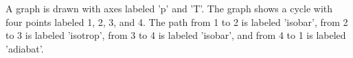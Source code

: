 A graph is drawn with axes labeled 'p' and 'T'. The graph shows a cycle with four points labeled 1, 2, 3, and 4. The path from 1 to 2 is labeled 'isobar', from 2 to 3 is labeled 'isotrop', from 3 to 4 is labeled 'isobar', and from 4 to 1 is labeled 'adiabat'.